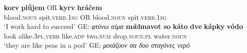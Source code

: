 \documentclass[output=paper,colorlinks,citecolor=brown]{langscibook}
\begin{document}
\begin{xlist}
\ex 
\gll \textbf{{korv}} \textbf{{plǘjem}} OR \textbf{{kyrv}} \textbf{{hráčem}} \\
blood.\textsc{noun} spit.\textsc{verb.1sg} OR  blood.\textsc{noun} spit.\textsc{verb.1sg} \\
\glt `I  work hard to succeed' GE: \textit{φτύνω αίμα}
\ex 
\gll \textbf{{mǽhnavot so}} \textbf{{káto}} \textbf{{dve}} \textbf{{kápky}} \textbf{{vódo}} \\ {look alike}.\textsc{3pl.verb} like.\textsc{adp} two.\textsc{num} drop.\textsc{noun.pl}  water.\textsc{noun}\\
\glt `they are like peas in a pod' GE: \textit{ μοιάζουν σα δυο σταγόνες νερό}
\end{xlist}
\z 




\printbibliography[heading=subbibliography,notkeyword=this]
\end{document}
